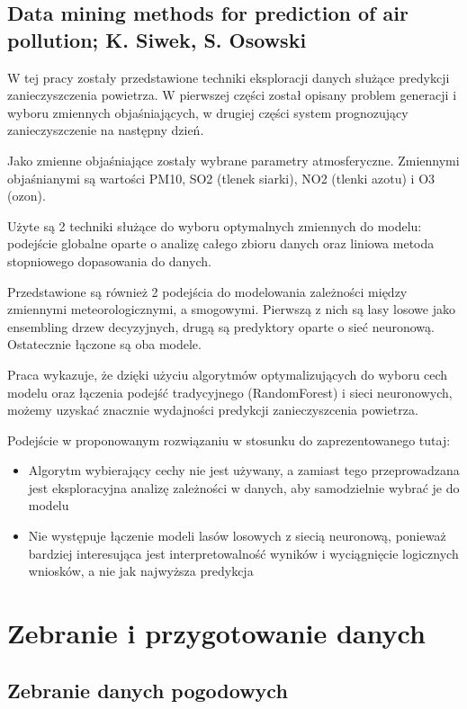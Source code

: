 \documentclass[a4paper,12pt,twoside,openany]{report}
\begin{document}
\section{Data mining methods for prediction of air pollution; K. Siwek, S. Osowski}

W tej pracy\cite{z5} zostały przedstawione techniki eksploracji danych służące predykcji zanieczyszczenia powietrza. W pierwszej części został opisany problem generacji i wyboru zmiennych objaśniających, w drugiej części system prognozujący zanieczyszczenie na następny dzień. 

Jako zmienne objaśniające zostały wybrane parametry atmosferyczne. Zmiennymi objaśnianymi są wartości PM10, SO2 (tlenek siarki), NO2 (tlenki azotu) i O3 (ozon).

Użyte są 2 techniki służące do wyboru optymalnych zmiennych do modelu: podejście globalne oparte o analizę całego zbioru danych oraz liniowa metoda stopniowego dopasowania do danych.

Przedstawione są również 2 podejścia do modelowania zależności między zmiennymi meteorologicznymi, a smogowymi. Pierwszą z nich są lasy losowe jako ensembling drzew decyzyjnych, drugą są predyktory oparte o sieć neuronową. Ostatecznie łączone są oba modele.

Praca wykazuje, że dzięki użyciu algorytmów optymalizujących do wyboru cech modelu oraz łączenia podejść tradycyjnego (RandomForest) i sieci neuronowych, możemy uzyskać znacznie wydajności predykcji zanieczyszcenia powietrza.

Podejście w proponowanym rozwiązaniu w stosunku do zaprezentowanego tutaj:
\begin{itemize}
	\item Algorytm wybierający cechy nie jest używany, a zamiast tego przeprowadzana jest eksploracyjna analizę zależności w danych, aby samodzielnie wybrać je do modelu
	
	\item Nie występuje łączenie modeli lasów losowych z siecią neuronową, ponieważ bardziej interesująca jest interpretowalność wyników i wyciągnięcie logicznych wniosków, a nie jak najwyższa predykcja
	
\end{itemize}


\chapter{Zebranie i przygotowanie danych}

\section{Zebranie danych pogodowych}
\end{document}
